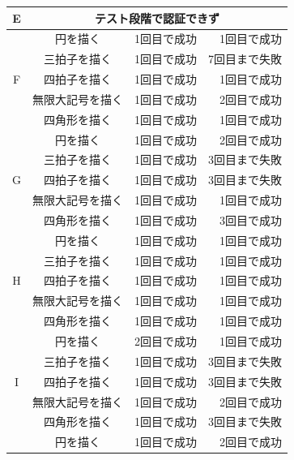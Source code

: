 \documentclass[12pt]{jreport}
\begin{document}
\begin{center}
\begin{longtable}{|c|c|r|r|}
                E & \multicolumn{3}{|c|}{テスト段階で認証できず} \\ \hline
                  & 円を描く & 1回目で成功 & 1回目で成功 \\ \cline{2-4} %
                  & 三拍子を描く & 1回目で成功 & 7回目まで失敗 \\ \cline{2-4}
                F & 四拍子を描く & 1回目で成功 & 1回目で成功 \\ \cline{2-4}
                  & 無限大記号を描く & 1回目で成功 & 2回目で成功 \\ \cline{2-4}
                  & 四角形を描く & 1回目で成功 & 1回目で成功 \\ \hline %
                  & 円を描く & 1回目で成功 & 2回目で成功 \\ \cline{2-4} %
                  & 三拍子を描く & 1回目で成功 & 3回目まで失敗 \\ \cline{2-4}
                G & 四拍子を描く & 1回目で成功 & 3回目まで失敗 \\ \cline{2-4}
                  & 無限大記号を描く & 1回目で成功 & 1回目で成功 \\ \cline{2-4}
                  & 四角形を描く & 1回目で成功 & 3回目で成功 \\ \hline %
                  & 円を描く & 1回目で成功 & 1回目で成功 \\ \cline{2-4} %
                  & 三拍子を描く & 1回目で成功 & 1回目で成功 \\ \cline{2-4}
                H & 四拍子を描く & 1回目で成功 & 1回目で成功 \\ \cline{2-4}
                  & 無限大記号を描く & 1回目で成功 & 1回目で成功 \\ \cline{2-4}
                  & 四角形を描く & 1回目で成功 & 1回目で成功 \\ \hline %
                  & 円を描く & 2回目で成功 & 1回目で成功 \\ \cline{2-4} %
                  & 三拍子を描く & 1回目で成功 & 3回目まで失敗 \\ \cline{2-4}
                I & 四拍子を描く & 1回目で成功 & 3回目まで失敗 \\ \cline{2-4}
                  & 無限大記号を描く & 1回目で成功 & 2回目で成功 \\ \cline{2-4}
                  & 四角形を描く & 1回目で成功 & 3回目まで失敗 \\ \hline %
                  & 円を描く & 1回目で成功 & 2回目で成功 \\ \cline{2-4} %

\end{longtable}
\end{center}
\end{document}
